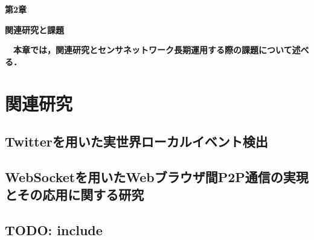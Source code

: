 \newpage
\setcounter{chapter}{2}
\setcounter{section}{0}

\begin{center}
\vspace{0.5cm}
\huge{\bf 第2章}
\par
\vspace{1cm}
\hrulefill
\par
\vspace{1cm}
\huge{\bf 関連研究と課題}
\par
\vspace{0.5cm}
\hrulefill
\vspace{1cm}
\par

\begin{flushleft}
\large{{\bf　本章では，関連研究とセンサネットワーク長期運用する際の課題について述べる．}}
\end{flushleft}
\end{center}


\newpage

\section{関連研究}

\newpage

\subsection{Twitterを用いた実世界ローカルイベント検出}

\newpage

\subsection{WebSocketを用いたWebブラウザ間P2P通信の実現とその応用に関する研究}

\newpage

\subsection{TODO: include}

\newpage

